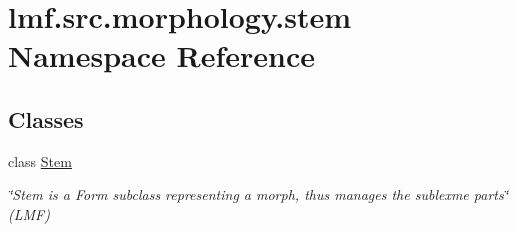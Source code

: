 \hypertarget{namespacelmf_1_1src_1_1morphology_1_1stem}{\section{lmf.\+src.\+morphology.\+stem Namespace Reference}
\label{namespacelmf_1_1src_1_1morphology_1_1stem}
}
\subsection*{Classes}
\begin{DoxyCompactItemize}
\item 
class \hyperlink{classlmf_1_1src_1_1morphology_1_1stem_1_1_stem}{Stem}
\begin{DoxyCompactList}\small\item\em \char`\"{}\+Stem is a Form subclass representing a morph, thus manages the sublexme parts\char`\"{} (L\+M\+F) \end{DoxyCompactList}\end{DoxyCompactItemize}
